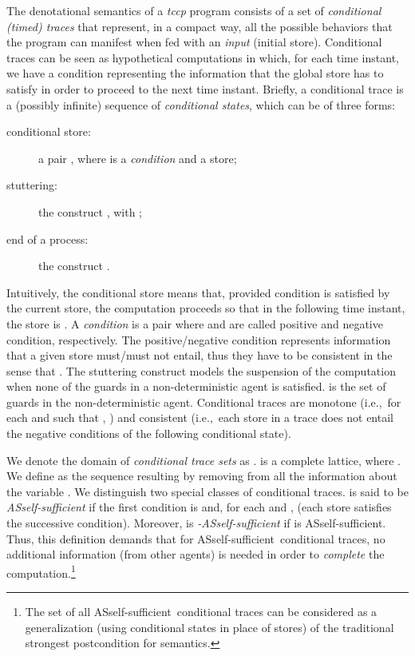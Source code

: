 \documentclass[american]{new_tlp}
\makeatletter
\providecommand{\ifempty}[3]{\def\@@@temp{#1}\ifx\@@@temp\@empty#2\else#3\fi}
\newcommand*{\closed}[1][A]{\ifempty{#1}{S}{s}elf-sufficient}
\newcommand*{\tccp}{\textit{tccp}}
\providecommand*{\ie}   {i.e.,}
\providecommand*{\resp} {respectively}
\makeatother
\begin{document}
The denotational semantics of a \tccp{} program consists of a set of
\emph{conditional (timed) traces} that represent, in a compact way, all the
possible behaviors that the program can manifest when fed with an
\emph{input} (initial store).  Conditional traces can be seen as
hypothetical computations in which, for each time instant, we have a
condition representing the information that the global store has to satisfy
in order to proceed to the next time instant.  Briefly, a conditional trace
is a (possibly infinite) sequence  of
\emph{conditional states}, which can be of three forms:
\begin{description}
    \item[conditional store:] 
    a pair , where  is a \emph{condition} and
     a store;
    
    \item[stuttering:] 
    the construct , with ;
    
    \item[end of a process:] 
    the construct .
\end{description}
Intuitively, the conditional store  means that, provided
condition  is satisfied by the current store, the computation
proceeds so that in the following time instant, the store is .  A
\emph{condition}  is a pair  where
 and  are called positive and
negative condition, \resp.  The positive/negative condition represents
information that a given store must/must not entail, thus they have to be
consistent in the sense that  .
The stuttering construct models the suspension of the computation when none
of the guards in a non-deterministic agent is satisfied.   is the set of
guards in the non-deterministic agent.  Conditional traces are monotone
(\ie\ for each  and  such that
, ) and consistent (\ie\ each store in a trace
does not entail the negative conditions of the following conditional
state).

We denote the domain of \emph{conditional trace sets} as .  
is a complete lattice, where .  We define as  the sequence resulting by removing
from  all the information about the variable .  We
distinguish two special classes of conditional traces.   is said
to be \emph{\closed} if the first condition is 
and, for each  and
,  (each store satisfies the successive condition).  Moreover,
 is \emph{-\closed} if  is \closed.
Thus, this definition demands that for \closed\ conditional traces, no
additional information (from other agents) is needed in order to
\emph{complete} the computation.\footnote{The set of all \closed\
conditional traces can be considered as a generalization (using conditional
states in place of stores) of the traditional strongest postcondition for
semantics.}
\end{document}
